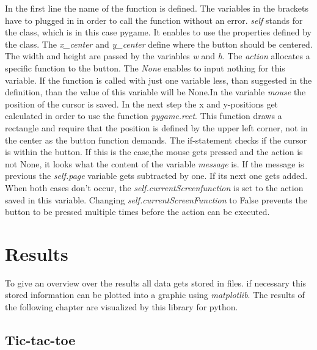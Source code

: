 \documentclass[12pt]{article}
\begin{document}
In the first line the name of the function is defined. The variables in the brackets have to plugged in in order to call the function without an error.  \textit{self} stands for the class, which is in this case pygame. It enables to use the properties defined by the class. The \textit{x\_center} and  \textit{y\_center} define where the button should be centered. The width and height are passed by the variables \textit{w} and  \textit{h}. The  \textit{action} allocates a specific function to the button. The \textit{None} enables to input nothing for this variable. If the function is called with just one variable less, than suggested in the definition, than the value of this variable will be None.In the variable \textit{mouse} the position of the cursor is saved. In the next step the x and y-positions get calculated in order to use the function \textit{pygame.rect}. This function draws a rectangle and require that the position is defined by the upper left corner, not in the center as the button function demands. The if-statement checks if the cursor is within the button. If this is the case,the mouse gets pressed and the action is not None, it looks what the content of the variable \textit{message} is. If the message is previous the \textit{self.page} variable gets subtracted by one. If its next one gets added. When both cases don't occur, the \textit{self.currentScreenfunction} is set to the action saved in this variable. Changing \textit{self.currentScreenFunction} to False prevents the button to be pressed multiple times before the action can be executed.

\section{Results}
To give an overview over the results all data gets stored in files. if necessary this stored information can be plotted into a graphic using \textit{matplotlib}. The results of the following chapter are visualized by this library for python.
\subsection{Tic-tac-toe}
\end{document}
